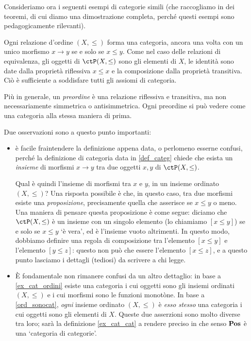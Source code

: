 Consideriamo ora i seguenti esempi di categorie simili (che raccogliamo in dei teoremi, di cui diamo una dimostrazione completa, perché questi esempi sono pedagogicamente rilevanti).
\begin{examples}\label{ord_sonocat}
	Ogni relazione d'ordine \((X,\le)\) forma una categoria, ancora una volta con un unico morfismo \(x\to y\) se e solo se \(x\le y\). Come nel caso delle relazioni di equivalenza, gli oggetti di \(\ctP(X,\le)\) sono gli elementi di \(X\), le identità sono date dalla proprietà riflessiva \(x\le x\) e la composizione dalla proprietà transitiva. Ciò è sufficiente a soddisfare tutti gli assiomi di categoria.

	Più in generale, un \emph{preordine} è una relazione riflessiva e transitiva, ma non necessariamente simmetrica o antisimmetrica. Ogni preordine si può vedere come una categoria alla stessa maniera di prima.
\end{examples}
\begin{remark}
	Due osservazioni sono a questo punto importanti:
	\begin{itemize}
		\item è facile fraintendere la definizione appena data, o perlomeno esserne confusi, perché la definizione di categoria data in \ref{def_categ} chiede che esista un \emph{insieme} di morfismi \(x\to y\) tra due oggetti \(x,y\) di \(\ctP(X,\le)\).

      Qual è quindi l'insieme di morfismi tra \(x\) e \(y\), in un insieme ordinato $(X,\le)$? Una risposta possibile è che, in questo caso, tra due morfismi esiste una \emph{proposizione}, precisamente quella che asserisce se \(x\le y\) o meno. Una maniera di pensare questa proposizione è come segue: diciamo che \(\ctP(X,\le)\) è un insieme con un singolo elemento (lo chiamiamo \([x\le y]\)) se e solo se \(x\le y\) `è vera', ed è l'insieme vuoto altrimenti. In questo modo, dobbiamo definire una regola di composizione tra l'elemento \([x\le y]\) e l'elemento \([y\le z]\): questo non può che essere l'elemento \([x\le z]\), e a questo punto lasciamo i dettagli (tediosi) da scrivere a chi legge.
		\item \`E fondamentale non rimanere confusi da un altro dettaglio: in base a \ref{ex_cat_ordini} esiste una categoria i cui oggetti sono gli insiemi ordinati \((X,\le)\) e i cui morfismi sono le funzioni monotòne. In base a \ref{ord_sonocat}, \emph{ogni} insieme ordinato \((X,\le)\) è \emph{esso stesso} una categoria i cui oggetti sono gli elementi di \(X\). Queste due asserzioni sono molto diverse tra loro; sarà la definizione \ref{ex_cat_cat} a rendere preciso in che senso \(\mathbf{Pos}\) è una `categoria di categorie'.
	\end{itemize}
\end{remark}
